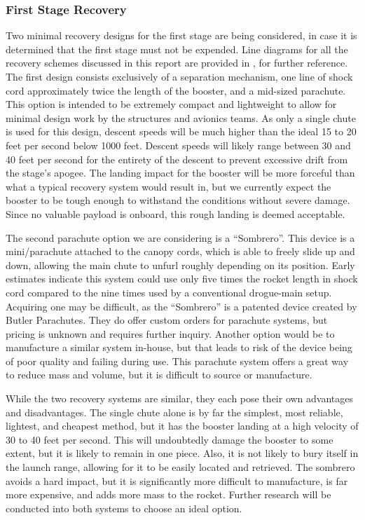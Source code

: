 \subsubsection{First Stage Recovery}
Two minimal recovery designs for the first stage are being considered, in case it is determined that the first stage must not be expended. Line diagrams for all the recovery schemes discussed in this report are provided in , for further reference. The first design consists exclusively of a separation mechanism, one line of shock cord approximately twice the length of the booster, and a mid-sized parachute. This option is intended to be extremely compact and lightweight to allow for minimal design work by the structures and avionics teams. As only a single chute is used for this design, descent speeds will be much higher than the ideal 15 to 20 feet per second below 1000 feet. Descent speeds will likely range between 30 and 40 feet per second for the entirety of the descent to prevent excessive drift from the stage’s apogee. The landing impact for the booster will be more forceful than what a typical recovery system would result in, but we currently expect the booster to be tough enough to withstand the conditions without severe damage. Since no valuable payload is onboard, this rough landing is deemed acceptable.

The second parachute option we are considering is a ``Sombrero''. This device is a mini\-/parachute attached to the canopy cords, which is able to freely slide up and down, allowing the main chute to unfurl roughly depending on its position. Early estimates indicate this system could use only five times the rocket length in shock cord compared to the nine times used by a conventional drogue-main setup. Acquiring one may be difficult, as the ``Sombrero'' is a patented device created by Butler Parachutes. They do offer custom orders for parachute systems, but pricing is unknown and requires further inquiry. Another option would be to manufacture a similar system in-house, but that leads to risk of the device being of poor quality and failing during use. This parachute system offers a great way to reduce mass and volume, but it is difficult to source or manufacture.

While the two recovery systems are similar, they each pose their own advantages and disadvantages. The single chute alone is by far the simplest, most reliable, lightest, and cheapest method, but it has the booster landing at a high velocity of 30 to 40 feet per second. This will undoubtedly damage the booster to some extent, but it is likely to remain in one piece. Also, it is not likely to bury itself in the launch range, allowing for it to be easily located and retrieved. The sombrero avoids a hard impact, but it is significantly more difficult to manufacture, is far more expensive, and adds more mass to the rocket. Further research will be conducted into both systems to choose an ideal option.


